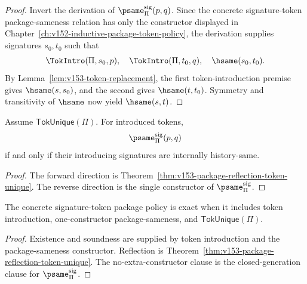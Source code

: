 \begin{proof}
Invert the derivation of \(\psame_{\Pi}^{\mathrm{sig}}(p,q)\). Since the concrete signature-token package-sameness relation has only the constructor displayed in Chapter~\ref{ch:v152-inductive-package-token-policy}, the derivation supplies signatures \(s_0,t_0\) such that
\[
  \TokIntro(\Pi,s_0,p),\quad
  \TokIntro(\Pi,t_0,q),\quad
  \hsame(s_0,t_0).
\]
By Lemma~\ref{lem:v153-token-replacement}, the first token-introduction premise gives \(\hsame(s,s_0)\), and the second gives \(\hsame(t,t_0)\). Symmetry and transitivity of \(\hsame\) now yield \(\hsame(s,t)\).
\end{proof}

\begin{corollary}
\label{cor:v153-exact-package-sameness}
Assume \(\mathsf{TokUnique}(\Pi)\). For introduced tokens,
\[
  \psame_{\Pi}^{\mathrm{sig}}(p,q)
\]
if and only if their introducing signatures are internally history-same.
\end{corollary}

\begin{proof}
The forward direction is Theorem~\ref{thm:v153-package-reflection-token-unique}. The reverse direction is the single constructor of \(\psame_{\Pi}^{\mathrm{sig}}\).
\end{proof}

\begin{corollary}
\label{cor:v153-updated-package-token-policy}
The concrete signature-token package policy is exact when it includes token introduction, one-constructor package-sameness, and \(\mathsf{TokUnique}(\Pi)\).
\end{corollary}

\begin{proof}
Existence and soundness are supplied by token introduction and the package-sameness constructor. Reflection is Theorem~\ref{thm:v153-package-reflection-token-unique}. The no-extra-constructor clause is the closed-generation clause for \(\psame_{\Pi}^{\mathrm{sig}}\).
\end{proof}
